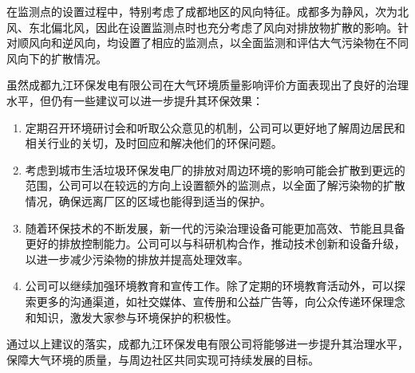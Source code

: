 在监测点的设置过程中，特别考虑了成都地区的风向特征。成都多为静风，次为北风、东北偏北风，因此在设置监测点时也充分考虑了风向对排放物扩散的影响。针对顺风向和逆风向，均设置了相应的监测点，以全面监测和评估大气污染物在不同风向下的扩散情况。


虽然成都九江环保发电有限公司在大气环境质量影响评价方面表现出了良好的治理水平，但仍有一些建议可以进一步提升其环保效果：
\begin{enumerate}
    \item 定期召开环境研讨会和听取公众意见的机制，公司可以更好地了解周边居民和相关行业的关切，及时回应和解决他们的环保问题。
    \item 考虑到城市生活垃圾环保发电厂的排放对周边环境的影响可能会扩散到更远的范围，公司可以在较远的方向上设置额外的监测点，以全面了解污染物的扩散情况，确保远离厂区的区域也能得到适当的保护。
    \item 随着环保技术的不断发展，新一代的污染治理设备可能更加高效、节能且具备更好的排放控制能力。公司可以与科研机构合作，推动技术创新和设备升级，以进一步减少污染物的排放并提高处理效率。
    \item 公司可以继续加强环境教育和宣传工作。除了定期的环境教育活动外，可以探索更多的沟通渠道，如社交媒体、宣传册和公益广告等，向公众传递环保理念和知识，激发大家参与环境保护的积极性。
\end{enumerate}

通过以上建议的落实，成都九江环保发电有限公司将能够进一步提升其治理水平，保障大气环境的质量，与周边社区共同实现可持续发展的目标。
